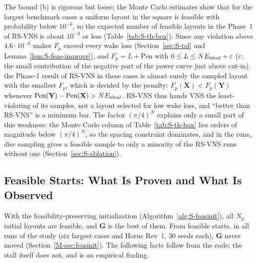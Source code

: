 The bound (b) is rigorous but loose; the Monte Carlo estimates show that for the largest benchmark cases a uniform layout in the square is feasible with probability below $10^{-6}$, so the expected number of feasible layouts in the Phase~1 of RS-VNS is about $10^{-3}$ or less (Table~\ref{tab:S-th-box}). Since any violation above $4.6\cdot10^{-8}$ makes $F_p$ exceed every wake loss (Section~\ref{sec:S-tol} and Lemma~\ref{lem:S-feas-improve}), and $F_p=L+\mathrm{Pen}$ with $0\le L\le NE_{\rm ideal}+\varepsilon$ ($\varepsilon$: the small contribution of the negative part of the power curve just above cut-in), the Phase-1 result of RS-VNS in these cases is almost surely the sampled layout with the smallest $F_p$, which is decided by the penalty: $F_p(\mathbf X)<F_p(\mathbf Y)$ whenever $\mathrm{Pen}(\mathbf Y)-\mathrm{Pen}(\mathbf X)>NE_{\rm ideal}$. RS-VNS thus hands VNS the least-violating of its samples, not a layout selected for low wake loss, and ``better than RS-VNS'' is a minimum bar. The factor $(\pi/4)^N$ explains only a small part of this weakness: the Monte Carlo column of Table~\ref{tab:S-th-box} lies orders of magnitude below $(\pi/4)^N$, so the spacing constraint dominates, and in the runs, disc sampling gives a feasible sample to only a minority of the RS-VNS runs without one (Section~\ref{sec:S-ablation}).

\subsection{Feasible Starts: What Is Proven and What Is Observed}
\label{sec:S-th-feas}
With the feasibility-preserving initialization (Algorithm~\ref{alg:S-feasinit}), all $N_p$ initial layouts are feasible, and $\mathbf G$ is the best of them. From feasible starts, in all runs of the study (six largest cases and Horns Rev~1, 30 seeds each), $\mathbf G$ never moved (Section~\ref{M-sec:feasinit}). The following facts follow from the code; the stall itself does not, and is an empirical finding.

